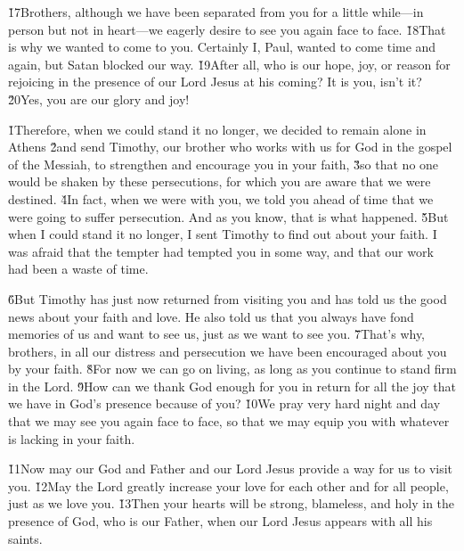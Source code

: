 \v{17}Brothers, although we have been separated from you for a little while---in person but not in heart---we eagerly desire to see you again face to face. \v{18}That is why we wanted to come to you. Certainly I, Paul, wanted to come time and again, but Satan blocked our way. \v{19}After all, who is our hope, joy, or reason for rejoicing in the presence of our Lord Jesus at his coming? It is you, isn't it? \v{20}Yes, you are our glory and joy!

\v{1}Therefore, when we could stand it no longer, we decided to remain alone in Athens \v{2}and send Timothy, our brother who works with us for God in the gospel of the Messiah, to strengthen and encourage you in your faith, \v{3}so that no one would be shaken by these persecutions, for which you are aware that we were destined. \v{4}In fact, when we were with you, we told you ahead of time that we were going to suffer persecution. And as you know, that is what happened. \v{5}But when I could stand it no longer, I sent Timothy to find out about your faith. I was afraid that the tempter had tempted you in some way, and that our work had been a waste of time.

\v{6}But Timothy has just now returned from visiting you and has told us the good news about your faith and love. He also told us that you always have fond memories of us and want to see us, just as we want to see you. \v{7}That's why, brothers, in all our distress and persecution we have been encouraged about you by your faith. \v{8}For now we can go on living, as long as you continue to stand firm in the Lord. \v{9}How can we thank God enough for you in return for all the joy that we have in God's presence because of you? \v{10}We pray very hard night and day that we may see you again face to face, so that we may equip you with whatever is lacking in your faith.

\v{11}Now may our God and Father and our Lord Jesus provide a way for us to visit you. \v{12}May the Lord greatly increase your love for each other and for all people, just as we love you. \v{13}Then your hearts will be strong, blameless, and holy in the presence of God, who is our Father, when our Lord Jesus appears with all his saints.

